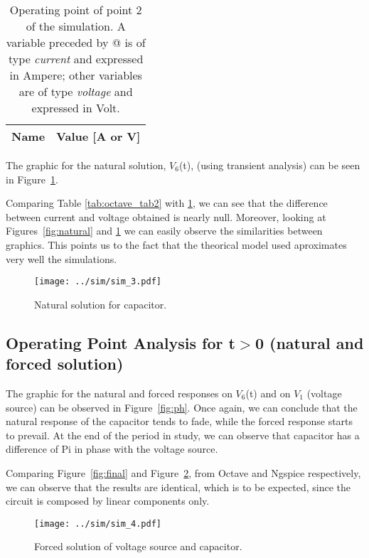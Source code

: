 \begin{table}[H]
  \centering
  \begin{tabular}{|l|r|}
    \hline    
    {\bf Name} & {\bf Value [A or V]} \\ \hline
    
  \end{tabular}
  \caption{Operating point of point 2 of the simulation. A variable preceded by @ is of type {\em current}
    and expressed in Ampere; other variables are of type {\it voltage} and expressed in
    Volt.}
  \label{tab:op2}
\end{table}


The graphic for the natural solution, $V_6$(t), (using transient analysis) can be seen in Figure~\ref{fig:nat_sol}.

Comparing Table \ref{tab:octave_tab2} with \ref{tab:op2}, we can see that the difference between current and voltage obtained is nearly null. Moreover, looking at Figures~\ref{fig:natural} and \ref{fig:nat_sol} we can easily observe the similarities between graphics. This points us to the fact that the theorical model used aproximates very well the simulations.

\begin{figure}[H] \centering
\texttt{[image: ../sim/sim\_3.pdf]}
\caption{Natural solution for capacitor.}
\label{fig:nat_sol}
\end{figure}
\newpage
\subsection{Operating Point Analysis for t$>$0 (natural and forced solution)}

\tab The graphic for the natural and forced responses on $V_6$(t) and on $V_1$ (voltage source) can be observed in Figure~\ref{fig:ph}. Once again, we can conclude that the natural response of the capacitor tends to fade, while the forced response starts to prevail. At the end of the period in study, we can observe that capacitor has a difference of Pi in phase with the voltage source.

Comparing Figure~\ref{fig:final} and Figure~\ref{fig:nat_for}, from Octave and Ngspice respectively, we can observe that the results are identical, which is to be expected, since the circuit is composed by linear components only.

\begin{figure}[H] \centering
\texttt{[image: ../sim/sim\_4.pdf]}
\caption{Forced solution of voltage source and capacitor.}
\label{fig:nat_for}
\end{figure}
